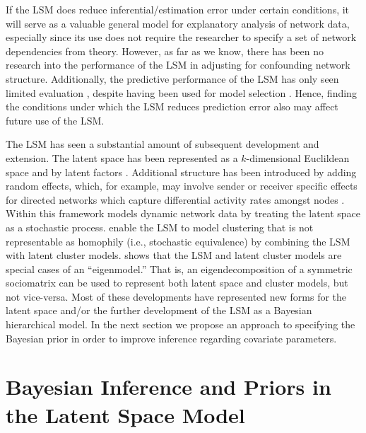 \documentclass[11pt]{article}
\begin{document}
If the LSM does reduce inferential/estimation error under certain conditions, it will serve as a valuable general model for explanatory analysis of network data, especially since its use does not require the researcher to specify a set of network dependencies from theory. However, as far as we know, there has been no research into the performance of the LSM in adjusting for confounding network structure. Additionally, the predictive performance of the LSM has only seen limited evaluation \citep{hoff2002latent}, despite having been used for model selection \citep{ward2013gravity, fletcher2011social, fletcher2013network, chiu2011unifying}. Hence, finding the conditions under which the LSM reduces prediction error also may affect future use of the LSM.

The LSM has seen a substantial amount of subsequent development and extension. The latent space has been represented as a $k$-dimensional Euclildean space and by latent factors \citep{hoff2002latent, hoff2009multiplicative}. Additional structure has been introduced by adding random effects, which, for example, may involve sender or receiver specific effects for directed networks which capture differential activity rates amongst nodes \citep{hoff2003random}. Within this framework \cite{westveld2011mixed} models dynamic network data by treating the latent space as a stochastic process. \cite{handcock2007model} enable the LSM to model clustering that is not representable as homophily (i.e., stochastic equivalence) by combining the LSM with latent cluster models. \cite{hoff2008modeling} shows that the LSM and latent cluster models are special cases of an ``eigenmodel.'' That is, an eigendecomposition of a symmetric sociomatrix can be used to represent both latent space and cluster models, but not vice-versa. Most of these developments have represented new forms for the latent space and/or the further development of the LSM as a Bayesian hierarchical model. In the next section we propose an approach to specifying the Bayesian prior in order to improve inference regarding covariate parameters. 

\section{Bayesian Inference and Priors in the Latent Space Model}
\end{document}
